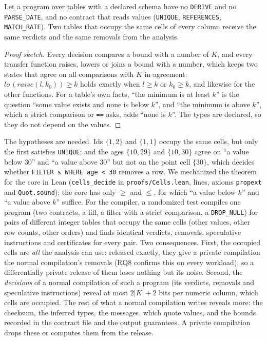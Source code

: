 \begin{theorem}[Cells]\label{thm:cells}
Let a program over tables with a declared schema have no \texttt{DERIVE} and no \texttt{PARSE\_DATE}, and
no contract that reads values (\texttt{UNIQUE}, \texttt{REFERENCES}, \texttt{MATCH\_RATE}). Two tables
that occupy the same cells of every column receive the same verdicts and the same removals from the
analysis.
\end{theorem}
\begin{proof}[Proof sketch]
Every decision compares a bound with a number of $K$, and every transfer function raises, lowers or
joins a bound with a number, which keeps two states that agree on all comparisons with $K$ in agreement:
$\textit{lo}\,(\textit{raise}(l, k_0)) \ge k$ holds exactly when $l \ge k$ or $k_0 \ge k$, and likewise for
the other functions. For a table's own facts, ``the minimum is at least $k$'' is the question ``some value
exists and none is below $k$'', and ``the minimum is above $k$'', which a strict comparison or \texttt{==}
asks, adds ``none is $k$''. The types are declared, so they do not depend on the values.
\end{proof}

The hypotheses are needed. Ids $\{1,2\}$ and $\{1,1\}$ occupy the same cells, but only the first satisfies
\texttt{UNIQUE}; and the ages $\{10,29\}$ and $\{10,30\}$ agree on ``a value below 30'' and ``a value above
30'' but not on the point cell $\{30\}$, which decides whether \texttt{FILTER s WHERE age < 30} removes a
row. We mechanized the theorem for the core in Lean (\texttt{cells\_decide} in \texttt{proofs/Cells.lean},
\LeanCellsLines{} lines, axioms \texttt{propext} and \texttt{Quot.sound}); the core has only $\ge$ and $\le$,
for which ``a value below $k$'' and ``a value above $k$'' suffice. For the compiler, a randomized test
compiles one program (two contracts, a fill, a filter with a strict comparison, a \texttt{DROP\_NULL}) for
\PrivCellPairs{} pairs of different integer tables that occupy the same cells (other values, other row
counts, other orders) and finds identical verdicts, removals, speculative instructions and certificates
for every pair. Two consequences. First, the occupied cells are \emph{all} the analysis can use: released
exactly, they give a private compilation the normal compilation's removals (RQ8 confirms this on every
workload), so a differentially private release of them loses nothing but its noise. Second, the
\emph{decisions} of a normal compilation of such a program (its verdicts, removals and speculative
instructions) reveal at most $2|K|+2$ bits per numeric column, which cells are occupied. The rest of what
a normal compilation writes reveals more: the checksum, the inferred types, the messages, which quote
values, and the bounds recorded in the contract file and the output guarantees. A private compilation
drops these or computes them from the release.

